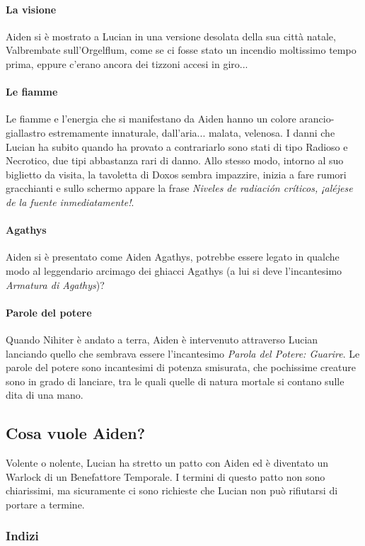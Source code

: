 \documentclass[letterpaper,twocolumn,openany,nodeprecatedcode]{dndbook}
\begin{document}
\paragraph{La visione} Aiden si è mostrato a Lucian in una versione desolata della sua città natale, Valbrembate sull'Orgelflum, come se ci fosse stato un incendio moltissimo tempo prima, eppure c'erano ancora dei tizzoni accesi in giro...
\paragraph{Le fiamme} Le fiamme e l'energia che si manifestano da Aiden hanno un colore arancio-giallastro estremamente innaturale, dall'aria... malata, velenosa. I danni che Lucian ha subito quando ha provato a contrariarlo sono stati di tipo Radioso e Necrotico, due tipi abbastanza rari di danno. Allo stesso modo, intorno al suo biglietto da visita, la tavoletta di Doxos sembra impazzire, inizia a fare rumori gracchianti e sullo schermo appare la frase \textit{Niveles de radiación críticos, ¡aléjese de la fuente inmediatamente!}.
\paragraph{Agathys} Aiden si è presentato come Aiden Agathys, potrebbe essere legato in qualche modo al leggendario arcimago dei ghiacci Agathys (a lui si deve l'incantesimo \textit{Armatura di Agathys})?
\paragraph{Parole del potere} Quando Nihiter è andato a terra, Aiden è intervenuto attraverso Lucian lanciando quello che sembrava essere l'incantesimo \textit{Parola del Potere: Guarire}. Le parole del potere sono incantesimi di potenza smisurata, che pochissime creature sono in grado di lanciare, tra le quali quelle di natura mortale si contano sulle dita di una mano.

\subsection{Cosa vuole Aiden?}
Volente o nolente, Lucian ha stretto un patto con Aiden ed è diventato un Warlock di un Benefattore Temporale. I termini di questo patto non sono chiarissimi, ma sicuramente ci sono richieste che Lucian non può rifiutarsi di portare a termine.

\subsubsection{Indizi}
\end{document}

